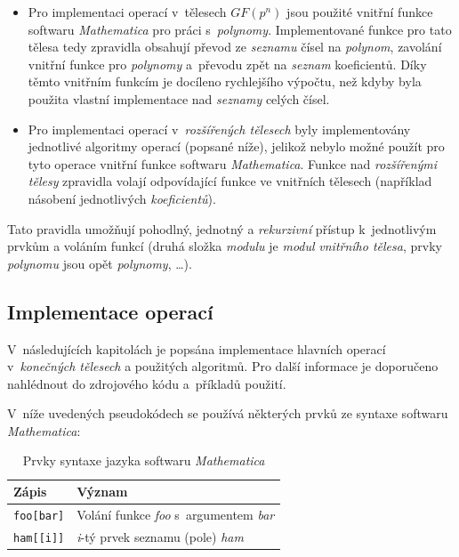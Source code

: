 \documentclass[thesis=M,czech,hidelinks]{FITthesis}[2012/06/26]
\newcommand{\0}{{\textcolor[gray]{0.75}{0}}}
\begin{document}
\begin{itemize}
    \item Pro implementaci operací v~tělesech $GF(p^n)$ jsou použité vnitřní
        funkce softwaru \emph{Mathematica} pro práci s~\emph{polynomy}.
        Implementované funkce pro tato tělesa tedy zpravidla obsahují převod ze
        \emph{seznamu} čísel na \emph{polynom}, zavolání vnitřní funkce pro
        \emph{polynomy} a~převodu zpět na \emph{seznam} koeficientů. Díky těmto
        vnitřním funkcím je docíleno rychlejšího výpočtu, než kdyby byla použita
        vlastní implementace nad \emph{seznamy} celých čísel.

    \item Pro implementaci operací v~\emph{rozšířených tělesech} byly
        implementovány jednotlivé algoritmy operací (popsané níže), jelikož
        nebylo možné použít pro tyto operace vnitřní funkce softwaru
        \emph{Mathematica}. Funkce nad \emph{rozšířenými tělesy} zpravidla
        volají odpovídající funkce ve vnitřních tělesech (například násobení
        jednotlivých \emph{koeficientů}).

\end{itemize}

Tato pravidla umožňují pohodlný, jednotný a \emph{rekurzivní} přístup
k~jednotlivým prvkům a voláním funkcí (druhá složka \emph{modulu} je
\emph{modul} \emph{vnitřního tělesa}, prvky \emph{polynomu} jsou opět
\emph{polynomy}, \ldots).

\subsection{Implementace operací}

V~následujících kapitolách je popsána implementace hlavních operací
v~\emph{konečných tělesech} a použitých algoritmů. Pro další informace je
doporučeno nahlédnout do zdrojového kódu a~příkladů použití.

V~níže uvedených pseudokódech se používá některých prvků ze syntaxe softwaru
\emph{Mathematica}:

\begin{table}[!ht]
    \centering
    \begin{tabular}{l  l}
        Zápis               & Význam                                            \\
        \hline
        \texttt{foo[bar]}   & Volání funkce \emph{foo} s~argumentem \emph{bar}  \\
        \texttt{ham[[i]]}   & \emph{i}-tý prvek seznamu (pole) \emph{ham}       \\
    \end{tabular}
    \caption{Prvky syntaxe jazyka softwaru \emph{Mathematica}}
\end{table}
\end{document}
